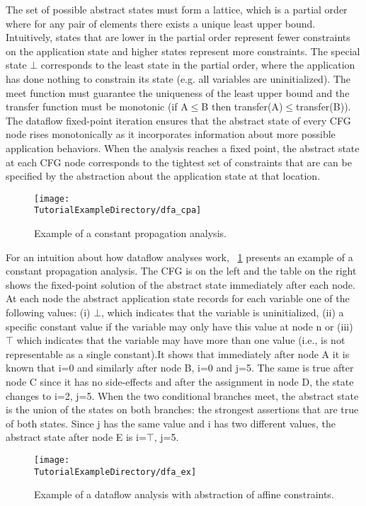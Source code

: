 The set of possible abstract states must form a lattice, which is a partial order where for any pair of elements there exists a unique least upper bound. Intuitively, states that are lower in the partial order represent fewer constraints on the application state and higher states represent more constraints. The special state $\bot$ corresponds to the least state in the partial order, where the application has done nothing to constrain its state (e.g. all variables are uninitialized). 
The meet function must guarantee the uniqueness of the least upper bound and the transfer function must be monotonic (if A$\le$B then transfer(A)$\le$transfer(B)). The dataflow fixed-point iteration ensures that the abstract state of every CFG node rises monotonically as it incorporates information about more possible application behaviors. When the analysis reaches a fixed point, the abstract state at each CFG node corresponds to the tightest set of constraints that are can be specified by the abstraction about the application state at that location.

\begin{figure}
\texttt{[image: \\TutorialExampleDirectory/dfa\_cpa]}
\caption{Example of a constant propagation analysis.}
\label{Tutorial:dfa_cpa}
\end{figure}

For an intuition about how dataflow analyses work, ~\ref{Tutorial:dfa_cpa} presents an example of a constant propagation analysis. The CFG is on the left and the table on the right shows the fixed-point solution of the abstract state immediately after each node. At each node the abstract application state records for each variable one of the following values: (i) $\bot$, which indicates that the variable is uninitialized, (ii) a specific constant value if the variable may only have this value at node n or (iii) $\top$ which indicates that the variable may have more than one value (i.e., is not representable as a single constant).It shows that immediately after node A it is known that i=0 and similarly after node B, i=0 and j=5. The same is true after node C since it has no side-effects and after the assignment in node D, the state changes to i=2, j=5.  When the two conditional branches meet, the abstract state is the union of the states on both branches: the strongest assertions that are true of both states. Since j has the same value and i has two different values, the abstract state after node E is i=$\top$, j=5.

\begin{figure}
\texttt{[image: \\TutorialExampleDirectory/dfa\_ex]}
\caption{Example of a dataflow analysis with abstraction of affine constraints.}
\label{Tutorial:dfa_ex}\end{figure}

